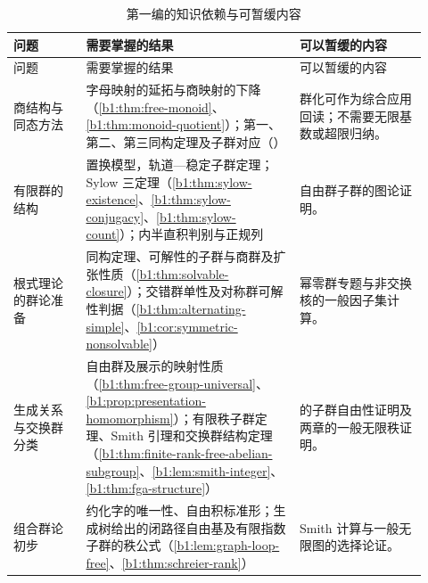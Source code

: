 \begingroup
	\renewcommand{\thetable}{表\nobreakspace1-\arabic{table}}
	\renewcommand{\theHtable}{part-overview.1.\arabic{table}}
	\begin{longtable}{@{}>{\raggedright\arraybackslash}p{0.16\linewidth}>{\raggedright\arraybackslash}p{0.47\linewidth}>{\raggedright\arraybackslash}p{0.29\linewidth}@{}}
		\caption{第一编的知识依赖与可暂缓内容}\label{b1:tab:part01-reading}\\
		\toprule
		问题 & 需要掌握的结果 & 可以暂缓的内容 \\
		\midrule
		\endfirsthead
		\toprule
		问题 & 需要掌握的结果 & 可以暂缓的内容 \\
		\midrule
		\endhead
		商结构与同态方法 & 字母映射的延拓与商映射的下降（\cref{b1:thm:free-monoid}、\cref{b1:thm:monoid-quotient}）；第一、第二、第三同构定理及子群对应（\secref{b1:sec:0204}） & 群化可作为综合应用回读；不需要无限基数或超限归纳。 \\[.7ex]
		有限群的结构 & 置换模型，轨道—稳定子群定理；Sylow 三定理（\cref{b1:thm:sylow-existence}、\cref{b1:thm:sylow-conjugacy}、\cref{b1:thm:sylow-count}）；内半直积判别与正规列 & 自由群子群的图论证明。 \\[.7ex]
		根式理论的群论准备 & 同构定理、可解性的子群与商群及扩张性质（\cref{b1:thm:solvable-closure}）；交错群单性及对称群可解性判据（\cref{b1:thm:alternating-simple}、\cref{b1:cor:symmetric-nonsolvable}） & 幂零群专题与非交换核的一般因子集计算。 \\[.7ex]
		生成关系与交换群分类 & 自由群及展示的映射性质（\cref{b1:thm:free-group-universal}、\cref{b1:prop:presentation-homomorphism}）；有限秩子群定理、Smith 引理和交换群结构定理（\cref{b1:thm:finite-rank-free-abelian-subgroup}、\cref{b1:lem:smith-integer}、\cref{b1:thm:fga-structure}） & \chapref{b1:ch:08}的子群自由性证明及两章的一般无限秩证明。 \\[.7ex]
		组合群论初步 & 约化字的唯一性、自由积标准形；生成树给出的闭路径自由基及有限指数子群的秩公式（\cref{b1:lem:graph-loop-free}、\cref{b1:thm:schreier-rank}） & Smith 计算与一般无限图的选择论证。 \\
		\bottomrule
	\end{longtable}
\endgroup










